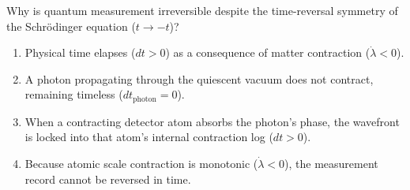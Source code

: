 Why is quantum measurement irreversible despite the time-reversal symmetry of the Schrödinger equation ($t \to -t$)?
\begin{enumerate}
    \item Physical time elapses ($dt > 0$) as a consequence of matter contraction ($\dot{\lambda} < 0$).
    \item A photon propagating through the quiescent vacuum does not contract, remaining timeless ($dt_{\mathrm{photon}} = 0$).
    \item When a contracting detector atom absorbs the photon's phase, the wavefront is locked into that atom's internal contraction log ($dt > 0$).
    \item Because atomic scale contraction is monotonic ($\dot{\lambda} < 0$), the measurement record cannot be reversed in time.
\end{enumerate}

